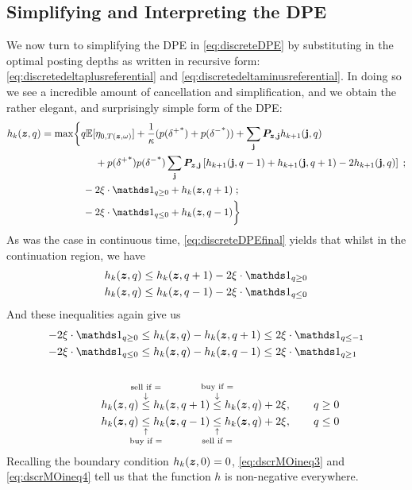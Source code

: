 \subsection{Simplifying and Interpreting the DPE}
We now turn to simplifying the DPE in \eqref{eq:discreteDPE} by substituting in the optimal posting depths as written in recursive form: \eqref{eq:discretedeltaplusreferential} and \eqref{eq:discretedeltaminusreferential}. In doing so we see a incredible amount of cancellation and simplification, and we obtain the rather elegant, and surprisingly simple form of the DPE:
\begin{equation}
\label{eq:discreteDPEfinal}
\begin{split}
h_k(\bz,q) & = \max \biggl\lbrace 
q\E[\eta_{0,T(\bz, \omega)}] + \frac{1}{\kappa}(p({\delta^+}^*)+p({\delta^-}^*))  + \sum_{\bj} \bP_{\bz,\bj} h_{k+1}(\bj,q) \\ 
& \hphantom{{}={} \max \biggl\lbrace {}+{}} + p({\delta^+}^*)p({\delta^-}^*)\sum_\bj \bP_{\bz,\bj} \left[ h_{k+1}(\bj, q-1) + h_{k+1}(\bj, q+1) -2 h_{k+1}(\bj, q)  \right] \; ; \\
& \hphantom{{}={} \max \biggl\lbrace } -2\xi \cdot \indicator_{q \geq 0} + h_k(\bz,q+1) \; ; \\
& \hphantom{{}={} \max \biggl\lbrace } -2\xi \cdot \indicator_{q \leq 0} + h_k(\bz,q-1) \biggr\rbrace
\end{split}
\end{equation}
As was the case in continuous time, \eqref{eq:discreteDPEfinal} yields that whilst in the continuation region, we have
\begin{align}
h_k(\bz,q) & \leq h_k(\bz, q+1) - 2 \xi \cdot \indicator_{q \geq 0} \\
h_k(\bz,q) & \leq h_k(\bz, q-1) - 2 \xi \cdot \indicator_{q \leq 0}
\end{align}
And these inequalities again give us
\begin{align}
-2\xi \cdot \indicator_{q \geq 0} & \leq h_k(\bz,q) - h_k(\bz,q+1) \leq 2\xi \cdot \indicator_{q \leq -1} \label{eq:dscrMOineq1}\\
-2\xi \cdot \indicator_{q \leq 0} & \leq h_k(\bz,q) - h_k(\bz,q-1) \leq 2\xi \cdot \indicator_{q \geq 1} \label{eq:dscrMOineq2}\\[4ex]
h_k(\bz,q) & \overset{\text{\makebox[0pt]{sell if =}}}{\overset{\downarrow}{\leq}} h_k(\bz,q+1) \overset{\text{\makebox[0pt]{buy if =}}}{\overset{\downarrow}{\leq}} h_k(\bz,q) + 2\xi, \qquad q \geq 0 \label{eq:dscrMOineq3}\\
h_k(\bz,q) & \underset{\text{\makebox[0pt]{buy if =}}}{\underset{\uparrow}{\leq}} h_k(\bz,q-1) \underset{\text{\makebox[0pt]{sell if =}}}{\underset{\uparrow}{\leq}} h_k(\bz,q) + 2\xi, \qquad q \leq 0 \label{eq:dscrMOineq4}
\end{align}
Recalling the boundary condition $h_k(\bm{z},0) = 0$, \eqref{eq:dscrMOineq3} and \eqref{eq:dscrMOineq4} tell us that the function $h$ is non-negative everywhere.

